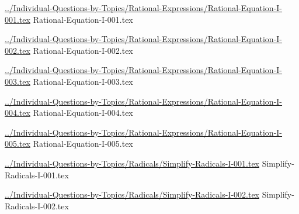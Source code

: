 \documentclass[answer,cancelspace,12pt]{exam}
\begin{document}
\begin{questions}
\question
\href{../Individual-Questions-by-Topics/Rational-Expressions/Rational-Equation-I-001.tex}{../Individual-Questions-by-Topics/Rational-Expressions/Rational-Equation-I-001.tex}
{Rational-Equation-I-001.tex}


\question
\href{../Individual-Questions-by-Topics/Rational-Expressions/Rational-Equation-I-002.tex}{../Individual-Questions-by-Topics/Rational-Expressions/Rational-Equation-I-002.tex}
{Rational-Equation-I-002.tex}


\question
\href{../Individual-Questions-by-Topics/Rational-Expressions/Rational-Equation-I-003.tex}{../Individual-Questions-by-Topics/Rational-Expressions/Rational-Equation-I-003.tex}
{Rational-Equation-I-003.tex}


\question
\href{../Individual-Questions-by-Topics/Rational-Expressions/Rational-Equation-I-004.tex}{../Individual-Questions-by-Topics/Rational-Expressions/Rational-Equation-I-004.tex}
{Rational-Equation-I-004.tex}



\question
\href{../Individual-Questions-by-Topics/Rational-Expressions/Rational-Equation-I-005.tex}{../Individual-Questions-by-Topics/Rational-Expressions/Rational-Equation-I-005.tex}
{Rational-Equation-I-005.tex}



\question
\href{../Individual-Questions-by-Topics/Radicals/Simplify-Radicals-I-001.tex}{../Individual-Questions-by-Topics/Radicals/Simplify-Radicals-I-001.tex}
{Simplify-Radicals-I-001.tex}


\question
\href{../Individual-Questions-by-Topics/Radicals/Simplify-Radicals-I-002.tex}{../Individual-Questions-by-Topics/Radicals/Simplify-Radicals-I-002.tex}
{Simplify-Radicals-I-002.tex}



\end{questions}
\end{document}
